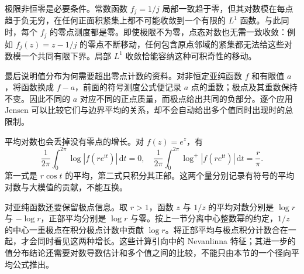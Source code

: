 \ProseParagraphBreak

极限非恒零是必要条件。常数函数 \(f_j=1/j\) 局部一致趋于零，但其对数模在每点趋于负无穷，在任何正面积紧集上都不可能收敛到一个有限的 \(L^1\) 函数。与此同时，每个 \(f_j\) 的零点测度都是零。即使极限不为零，点态对数也无需一致收敛：例如 \(f_j(z)=z-1/j\) 的零点不断移动，任何包含原点邻域的紧集都无法给这些对数模一个共同有限下界。局部 \(L^1\) 收敛恰能容纳这种可积奇性的移动。

\ProseParagraphBreak

最后说明值分布为何需要超出零点计数的资料。对非恒定亚纯函数 \(f\) 和有限值 \(a\)，将函数换成 \(f-a\)，前面的符号测度公式便记录 \(a\) 点的重数；极点及其重数保持不变。因此不同的 \(a\) 对应不同的正点质量，而极点给出共同的负部分。逐个应用 Jensen 可以比较它们与边界平均的关系，却不会自动给出多个值同时出现时的总限制。

平均对数也会丢掉没有零点的增长。对 \(f(z)=e^z\)，有
\[
 \frac1{2\pi}\int_0^{2\pi}\log|f(re^{\mathrm it})|\,\mathrm dt=0,
 \quad
 \frac1{2\pi}\int_0^{2\pi}\log^+|f(re^{\mathrm it})|\,\mathrm dt=\frac r\pi.
\]
第一式是 \(r\cos t\) 的平均，第二式只积分其正部。这两个量分别记录有符号的平均对数与大模值的贡献，不能互换。

对亚纯函数还要保留极点信息。取 \(r>1\)，函数 \(z\) 与 \(1/z\) 的平均对数分别是 \(\log r\) 与 \(-\log r\)，正部平均分别是 \(\log r\) 与零。按上一节分离中心整数幂的约定，\(1/z\) 的中心一重极点在积分极点计数中贡献 \(\log r\)。将正部平均与极点积分计数合在一起，才会同时看见这两种增长。这些计算引向中的 Nevanlinna 特征；其进一步的值分布结论还需要对数导数估计和多个值之间的比较，不能只由本节的一个径向平均公式推出。
